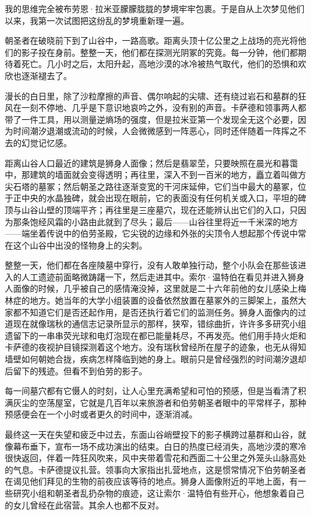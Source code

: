 \documentclass[AutoFakeBold=true]{book}
\begin{document}
\vspace*{1em}

我的思维完全被布劳恩·拉米亚朦朦胧胧的梦境牢牢包裹。于是自从上次梦见他们以来，我第一次试图把这纷乱的梦境重新理一遍。

朝圣者在破晓前下到了山谷中，一路高歌。距离头顶十亿公里之上战场的亮光将他们的影子投在身前。整整一天，他们都在探测光阴冢的究竟。每一分钟，他们都期待着死亡。几小时之后，太阳升起，高地沙漠的冰冷被热气取代，他们的恐惧和欢欣也逐渐褪去了。

漫长的白日里，除了沙粒摩擦的声音、偶尔响起的尖啸、还有绕过岩石和墓群的狂风在一刻不停地、几乎是下意识地哀吟之外，没有别的声音。卡萨德和领事两人都带了一件工具，用以测量逆熵场的强度，但是拉米亚第一个发现全无这个必要，因为时间潮汐退潮或流动的时候，人会微微感到一阵恶心，同时还伴随着一阵挥之不去的{\kaishu 幻觉记忆}感。

距离山谷人口最近的建筑是狮身人面像；然后是翡翠茔，只要映照在晨光和暮霭中，那建筑的墙面就会变得透明；再往里，深入不到一百米的地方，矗立着叫做方尖石塔的墓冢；然后朝圣之路往逐渐变宽的干河床延伸，它们当中最大的墓冢，位于正中央的水晶独碑，就会出现在眼前，它的表面没有任何机关或入口，平坦的碑顶与山谷山壁的顶端平齐；再往里是三座墓穴，现在还能辨认出它们的入口，只因为那条饱经风霜的小路由此就到了尽头；最后——山谷往里将近一千米深的地方——端坐着传说中的伯劳圣殿，它尖锐的边缘和外张的尖顶令人想起那个传说中常在这个山谷中出没的怪物身上的尖刺。

整整一天，他们都在各座陵墓中穿行，没有人敢单独行动，整个小队会在那些该进入的人工遗迹前面略微踌躇一下，然后走进其中。索尔·温特伯在看见并进入狮身人面像的时候，几乎被自己的感情淹没掉，这里就是二十六年前他的女儿感染上梅林症的地方。她当年的大学小组装置的设备依然放置在墓冢外的三脚架上，虽然大家都不知道它们是否还起作用，是否还执行着它们的监测任务。狮身人面像内的过道现在就像瑞秋的通信志记录所显示的那样，狭窄，错综曲折，许许多多研究小组遗留下的一串串荧光球和电灯泡现在都已能量耗尽，不再发亮。他们用手持火炬和卡萨德的夜视护目镜探测着这个地方。没有瑞秋曾经所在屋子的迹象，也无从得知墙壁如何朝她合拢，疾病怎样降临到她的身上。眼前只是曾经强烈的时间潮汐退却后留下的残迹。但看不到伯劳的影子。

每一间墓穴都有它慑人的时刻，让人心里充满希望和可怕的预感，但是当看清了积满灰尘的空荡屋室，它就是几百年以来旅游者和伯劳朝圣者眼中的平常样子，那种预感便会在一个小时或者更久的时间中，逐渐消减。

最终这一天在失望和疲乏中过去，东面山谷峭壁投下的影子横跨过墓群和山谷，就像幕布垂下，宣布一场不成功演出的结束。白日的热度已经消失，高地沙漠的寒冷很快返回，伴着一阵狂风吹来，风中夹带着雪花和西面二十公里之外笼头山脉高处的气息。卡萨德提议扎营。领事向大家指出扎营地点，这是惯常情况下伯劳朝圣者在谒见他们拜见的生物的前夜应该等待的地点。狮身人面像附近的平地上面，有一些研究小组和朝圣者乱扔杂物的痕迹，这让索尔·温特伯有些开心，他想象着自己的女儿曾经在此宿营。其余人也都不反对。
\end{document}
